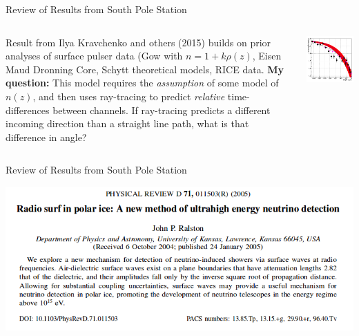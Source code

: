 \documentclass{beamer}
\begin{document}
\begin{frame}{Review of Results from South Pole Station}
\begin{columns}[T]
\begin{column}{0.5\textwidth}
Result from Ilya Kravchenko and others (2015) builds on prior analyses of surface pulser data (Gow with $n = 1+k\rho(z)$, Eisen Maud Dronning Core, Schytt theoretical models, RICE data.  \textbf{My question:} This model requires the \textit{assumption} of some model of $n(z)$, and then uses ray-tracing to predict \textit{relative} time-differences between channels. If ray-tracing predicts a different incoming direction than a straight line path, what is that difference in angle?
\end{column}
\begin{column}{0.5\textwidth}
\begin{center}
\includegraphics[width=\textwidth]{southpole1.png}
\end{center}
\end{column}
\end{columns}
\end{frame}

\begin{frame}{Review of Results from South Pole Station}
\begin{center}
\includegraphics[width=\textwidth]{Ralston.png}
\end{center}
\end{frame}
\end{document}
